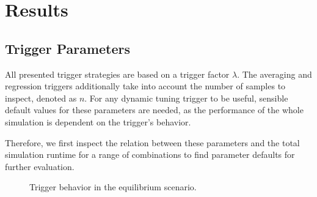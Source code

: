 \chapter[Results]{Results}
\label{cp:results}

{
	\parindent0pt
	\textellipsis
}


\section{Trigger Parameters}
All presented trigger strategies are based on a trigger factor $\lambda$. The averaging and regression triggers additionally take into account the number of samples to inspect, denoted as $n$. For any dynamic tuning trigger to be useful, sensible default values for these parameters are needed, as the performance of the whole simulation is dependent on the trigger's behavior.

Therefore, we first inspect the relation between these parameters and the total simulation runtime for a range of combinations to find parameter defaults for further evaluation.

\begin{figure}[htpb]
	\centering
	\caption{Trigger behavior in the equilibrium scenario.}
	\label{fig:params_equil}
\end{figure}

